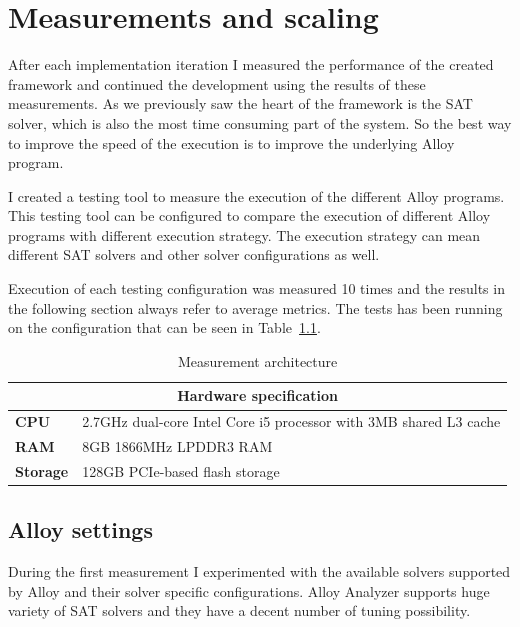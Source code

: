 \chapter{Measurements and scaling}
\label{cha:measurements}

After each implementation iteration I measured the performance of the created framework and continued the development using the results of these measurements. As we previously saw the heart of the framework is the SAT solver, which is also the most time consuming part of the system. So the best way to improve the speed of the execution is to improve the underlying Alloy program.

I created a testing tool to measure the execution of the different Alloy programs. This testing tool can be configured to compare the execution of different Alloy programs with different execution strategy. The execution strategy can mean different SAT solvers and other solver configurations as well.

Execution of each testing configuration was measured 10 times and the results in the following section always refer to average metrics. The tests has been running on the configuration that can be seen in Table~\ref{tab:hardwarespecification}.

\begin{table}[htb]
\begin{center}
\begin{tabular}{p{2cm}p{12cm}}
\toprule
	\multicolumn{2}{c}{\textbf{Hardware specification}}\\\midrule
	\textbf{CPU} & 2.7GHz dual-core Intel Core i5 processor with 3MB shared L3 cache\\
	\textbf{RAM} & 8GB 1866MHz LPDDR3 RAM\\
	\textbf{Storage} & 128GB PCIe-based flash storage\\
\bottomrule
\end{tabular}
\end{center}
\caption{\label{tab:hardwarespecification} Measurement architecture}
\end{table}

\section{Alloy settings}
\label{sec:alloysettings}

During the first measurement I experimented with the available solvers supported by Alloy and their solver specific configurations. Alloy Analyzer supports huge variety of SAT solvers and they have a decent number of tuning possibility.

